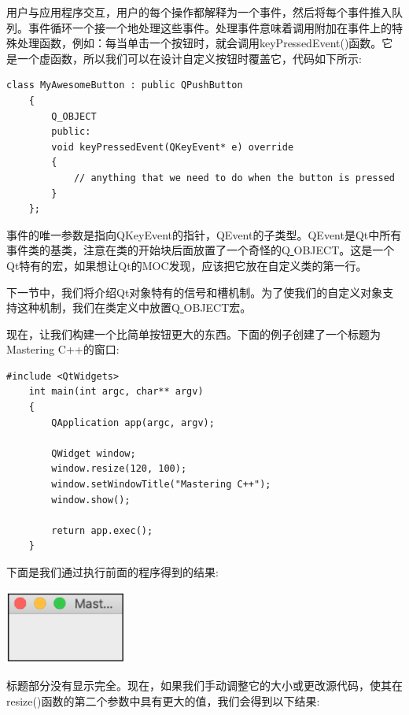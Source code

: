 用户与应用程序交互，用户的每个操作都解释为一个事件，然后将每个事件推入队列。事件循环一个接一个地处理这些事件。处理事件意味着调用附加在事件上的特殊处理函数，例如：每当单击一个按钮时，就会调用keyPressedEvent()函数。它是一个虚函数，所以我们可以在设计自定义按钮时覆盖它，代码如下所示: \par

\begin{lstlisting}[caption={}]
	class MyAwesomeButton : public QPushButton
	{
		Q_OBJECT
		public:
		void keyPressedEvent(QKeyEvent* e) override
		{
			// anything that we need to do when the button is pressed
		}
	};
\end{lstlisting}

事件的唯一参数是指向QKeyEvent的指针，QEvent的子类型。QEvent是Qt中所有事件类的基类，注意在类的开始块后面放置了一个奇怪的Q\underline{ }OBJECT。这是一个Qt特有的宏，如果想让Qt的MOC发现，应该把它放在自定义类的第一行。 \par
下一节中，我们将介绍Qt对象特有的信号和槽机制。为了使我们的自定义对象支持这种机制，我们在类定义中放置Q\underline{ }OBJECT宏。 \par
现在，让我们构建一个比简单按钮更大的东西。下面的例子创建了一个标题为Mastering C++的窗口: \par

\begin{lstlisting}[caption={}]
	#include <QtWidgets>
	int main(int argc, char** argv)
	{
		QApplication app(argc, argv);
		
		QWidget window;
		window.resize(120, 100);
		window.setWindowTitle("Mastering C++");
		window.show();
		
		return app.exec();
	}
\end{lstlisting}

下面是我们通过执行前面的程序得到的结果: \par

\begin{center}
	\includegraphics[width=0.3\textwidth]{content/Section-2/Chapter-14/6}
\end{center}

标题部分没有显示完全。现在，如果我们手动调整它的大小或更改源代码，使其在resize()函数的第二个参数中具有更大的值，我们会得到以下结果: \par

